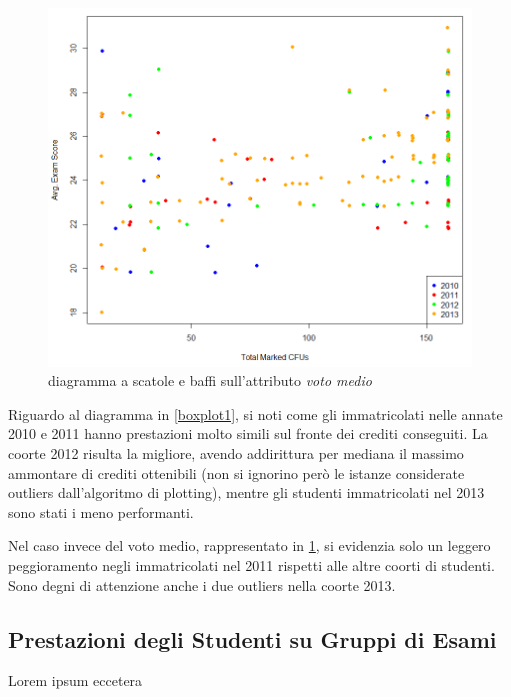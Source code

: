 \begin{figure}
    \centering
    \caption{diagramma a scatole e baffi sull'attributo \textit{voto medio}}
    \label{boxplot2}
	\includegraphics[scale=0.5]{img/scatter_plot_3.png}
\end{figure}

Riguardo al diagramma in \ref{boxplot1}, si noti come gli immatricolati nelle annate 2010 e 2011 hanno prestazioni molto simili sul fronte dei crediti conseguiti. La coorte 2012 risulta la migliore, avendo addirittura per mediana il massimo ammontare di crediti ottenibili (non si ignorino però le istanze considerate outliers dall’algoritmo di plotting), mentre gli studenti immatricolati nel 2013 sono stati i meno performanti.

Nel caso invece del voto medio, rappresentato in \ref{boxplot2}, si evidenzia solo un leggero peggioramento negli immatricolati nel 2011 rispetti alle altre coorti di studenti. Sono degni di attenzione anche i due outliers nella coorte 2013. 

\subsection{Prestazioni degli Studenti su Gruppi di Esami}

Lorem ipsum eccetera
